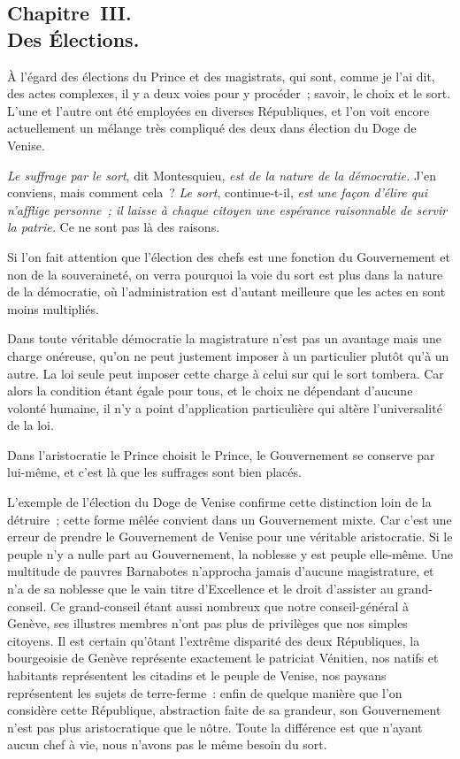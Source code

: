 \documentclass[french,twoside]{book} %
\begin{document}
\subsection[{Chapitre III. Des Élections.}]{Chapitre III. \\
Des Élections.}
\noindent À l’égard des élections du Prince et des magistrats, qui sont, comme je l’ai dit, des actes complexes, il y a deux voies pour y procéder ; savoir, le choix et le sort. L’une et l’autre ont été employées en diverses Républiques, et l’on voit encore actuellement un mélange très compliqué des deux dans élection du Doge de Venise.\par
{\itshape Le suffrage par le sort}, dit Montesquieu, {\itshape est de la nature de la démocratie.} J’en conviens, mais comment cela ? {\itshape Le sort}, continue-t-il, {\itshape est une façon d’élire qui n’afflige personne ; il laisse à chaque citoyen une espérance raisonnable de servir la patrie.} Ce ne sont pas là des raisons.\par
Si l’on fait attention que l’élection des chefs est une fonction du Gouvernement et non de la souveraineté, on verra pourquoi la voie du sort est plus dans la nature de la démocratie, où l’administration est d’autant meilleure que les actes en sont moins multipliés.\par
Dans toute véritable démocratie la magistrature n’est pas un avantage mais une charge onéreuse, qu’on ne peut justement imposer à un particulier plutôt qu’à un autre. La loi seule peut imposer cette charge à celui sur qui le sort tombera. Car alors la condition étant égale pour tous, et le choix ne dépendant d’aucune volonté humaine, il n’y a point d’application particulière qui altère l’universalité de la loi.\par
Dans l’aristocratie le Prince choisit le Prince, le Gouvernement se conserve par lui-même, et c’est là que les suffrages sont bien placés.\par
L’exemple de l’élection du Doge de Venise confirme cette distinction loin de la détruire ; cette forme mêlée convient dans un Gouvernement mixte. Car c’est une erreur de prendre le Gouvernement de Venise pour une véritable aristocratie. Si le peuple n’y a nulle part au Gouvernement, la noblesse y est peuple elle-même. Une multitude de pauvres Barnabotes n’approcha jamais d’aucune magistrature, et n’a de sa noblesse que le vain titre d’Excellence et le droit d’assister au grand-conseil. Ce grand-conseil étant aussi nombreux que notre conseil-général à Genève, ses illustres membres n’ont pas plus de privilèges que nos simples citoyens. Il est certain qu’ôtant l’extrême disparité des deux Républiques, la bourgeoisie de Genève représente exactement le patriciat Vénitien, nos natifs et habitants représentent les citadins et le peuple de Venise, nos paysans représentent les sujets de terre-ferme : enfin de quelque manière que l’on considère cette République, abstraction faite de sa grandeur, son Gouvernement n’est pas plus aristocratique que le nôtre. Toute la différence est que n’ayant aucun chef à vie, nous n’avons pas le même besoin du sort.\par
\end{document}
